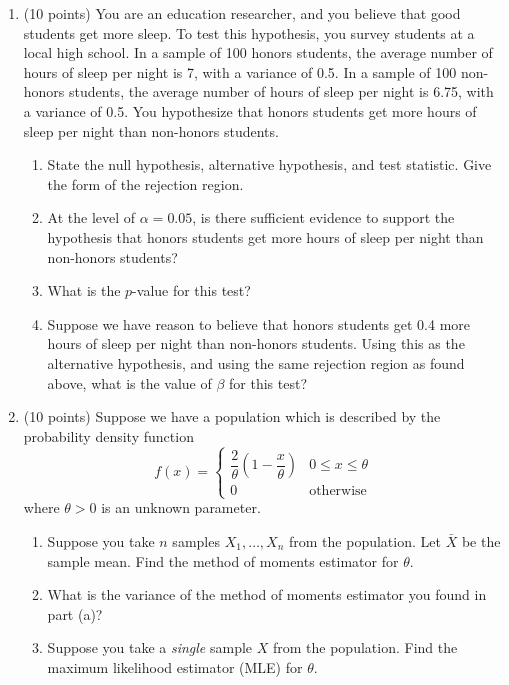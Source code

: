 \documentclass[12pt]{article}
\begin{document}
\pagebreak

\begin{enumerate}

\item (10 points) You are an education researcher, and you believe that good students get more sleep. To test this hypothesis, you survey students at a local high school. In a sample of 100 honors students, the average number of hours of sleep per night is 7, with a variance of 0.5. In a sample of 100 non-honors students, the average number of hours of sleep per night is 6.75, with a variance of 0.5. You hypothesize that honors students get more hours of sleep per night than non-honors students.
\begin{enumerate}
\item State the null hypothesis, alternative hypothesis, and test statistic. Give the form of the rejection region.
\item At the level of $\alpha = 0.05$, is there sufficient evidence to support the hypothesis that honors students get more hours of sleep per night than non-honors students? 
\item What is the $p$-value for this test?
\item Suppose we have reason to believe that honors students get 0.4 more hours of sleep per night than non-honors students. Using this as the alternative hypothesis, and using the same rejection region as found above, what is the value of $\beta$ for this test?
\end{enumerate}

\pagebreak

\item (10 points) Suppose we have a population which is described by the probability density function
\[
f(x) = \begin{cases}
\dfrac{2}{\theta} \left( 1 - \dfrac{x}{\theta} \right) & 0 \leq x \leq \theta \\
0 & \text{otherwise}
\end{cases}
\]
where $\theta > 0$ is an unknown parameter.
\begin{enumerate}
\item Suppose you take $n$ samples $X_1, \dots, X_n$ from the population. Let $\bar{X}$ be the sample mean. Find the method of moments estimator for $\theta$.
\item What is the variance of the method of moments estimator you found in part (a)?
\item Suppose you take a \emph{single} sample $X$ from the population. Find the maximum likelihood estimator (MLE) for $\theta$.
\end{enumerate}


\end{enumerate}
\end{document}

